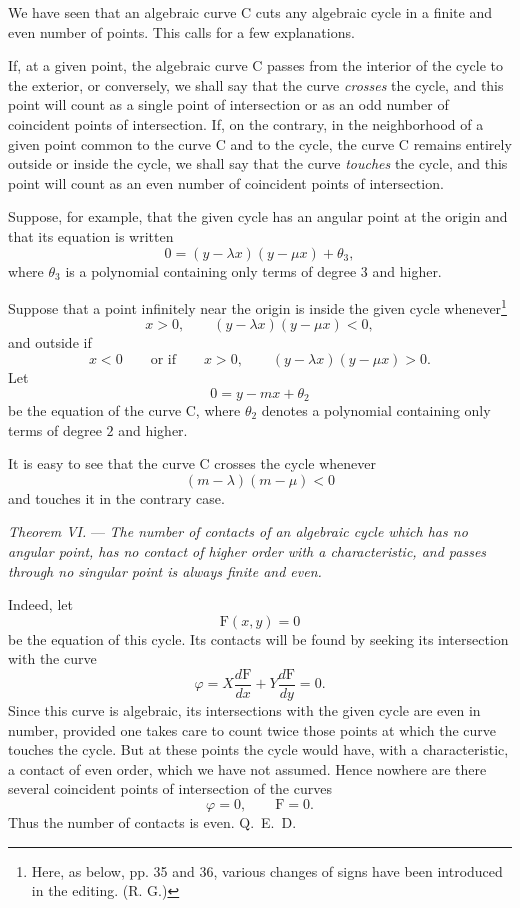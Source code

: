 \documentclass[11pt]{article}
\begin{document}
We have seen that an algebraic curve C cuts any algebraic cycle in a finite and even number of points. This calls for a few explanations.

If, at a given point, the algebraic curve C passes from the interior of the cycle to the exterior, or conversely, we shall say that the curve \emph{crosses} the cycle, and this point will count as a single point of intersection or as an odd number of coincident points of intersection. If, on the contrary, in the neighborhood of a given point common to the curve C and to the cycle, the curve C remains entirely outside or inside the cycle, we shall say that the curve \emph{touches} the cycle, and this point will count as an even number of coincident points of intersection.

Suppose, for example, that the given cycle has an angular point at the origin and that its equation is written
\[
0=(y-\lambda x)(y-\mu x)+\theta_3,
\]
where $\theta_3$ is a polynomial containing only terms of degree $3$ and higher.

Suppose that a point infinitely near the origin is inside the given cycle whenever\footnote{Here, as below, pp. 35 and 36, various changes of signs have been introduced in the editing. (R. G.)}
\[
x>0,\qquad (y-\lambda x)(y-\mu x)<0,
\]
and outside if
\[
x<0\qquad\text{or if}\qquad x>0,\qquad (y-\lambda x)(y-\mu x)>0.
\]
Let
\[
0=y-mx+\theta_2
\]
be the equation of the curve C, where $\theta_2$ denotes a polynomial containing only terms of degree $2$ and higher.

It is easy to see that the curve C crosses the cycle whenever
\[
(m-\lambda)(m-\mu)<0
\]
and touches it in the contrary case.

\emph{Theorem VI.} --- \emph{The number of contacts of an algebraic cycle which has no angular point, has no contact of higher order with a characteristic, and passes through no singular point is always finite and even.}

Indeed, let
\[
\mathrm F(x,y)=0
\]
be the equation of this cycle. Its contacts will be found by seeking its intersection with the curve
\[
\varphi=X\frac{d\mathrm F}{dx}+Y\frac{d\mathrm F}{dy}=0.
\]
Since this curve is algebraic, its intersections with the given cycle are even in number, provided one takes care to count twice those points at which the curve touches the cycle. But at these points the cycle would have, with a characteristic, a contact of even order, which we have not assumed. Hence nowhere are there several coincident points of intersection of the curves
\[
\varphi=0,\qquad \mathrm F=0.
\]
Thus the number of contacts is even. \hfill\mbox{Q. E. D.}
\end{document}
